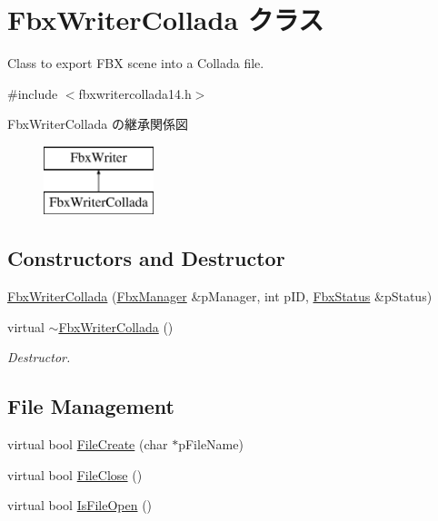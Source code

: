 \hypertarget{class_fbx_writer_collada}{}\section{Fbx\+Writer\+Collada クラス}
\label{class_fbx_writer_collada}


Class to export F\+BX scene into a Collada file.  




{\ttfamily \#include $<$fbxwritercollada14.\+h$>$}

Fbx\+Writer\+Collada の継承関係図\begin{figure}[H]
\begin{center}
\leavevmode
\includegraphics[height=2.000000cm]{class_fbx_writer_collada}
\end{center}
\end{figure}
\subsection*{Constructors and Destructor}
\begin{DoxyCompactItemize}
\item 
\hyperlink{class_fbx_writer_collada_aed549791a8dec6dbeba7a6293c098cdb}{Fbx\+Writer\+Collada} (\hyperlink{class_fbx_manager}{Fbx\+Manager} \&p\+Manager, int p\+ID, \hyperlink{class_fbx_status}{Fbx\+Status} \&p\+Status)
\item 
virtual \hyperlink{class_fbx_writer_collada_a115ea7677c58adb2761c2d7e5c17ac6d}{$\sim$\+Fbx\+Writer\+Collada} ()
\begin{DoxyCompactList}\small\item\em Destructor. \end{DoxyCompactList}\end{DoxyCompactItemize}
\subsection*{File Management}
\begin{DoxyCompactItemize}
\item 
virtual bool \hyperlink{class_fbx_writer_collada_a973e285681d8486e74a200812eeee70a}{File\+Create} (char $\ast$p\+File\+Name)
\item 
virtual bool \hyperlink{class_fbx_writer_collada_ae33b59a7bdbd04cca55a4632c7204f5e}{File\+Close} ()
\item 
virtual bool \hyperlink{class_fbx_writer_collada_a77c117aa61d57faf57e6810823938cbd}{Is\+File\+Open} ()
\end{DoxyCompactItemize}
